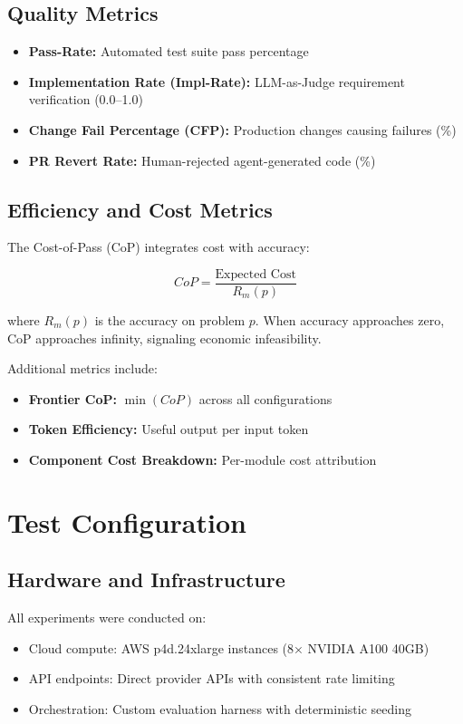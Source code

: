 \documentclass[11pt]{article}
\begin{document}
\subsection{Quality Metrics}
\begin{itemize}
    \item \textbf{Pass-Rate:} Automated test suite pass percentage
    \item \textbf{Implementation Rate (Impl-Rate):} LLM-as-Judge requirement verification (0.0--1.0)
    \item \textbf{Change Fail Percentage (CFP):} Production changes causing failures (\%)
    \item \textbf{PR Revert Rate:} Human-rejected agent-generated code (\%)
\end{itemize}

\subsection{Efficiency and Cost Metrics}
The Cost-of-Pass (CoP) integrates cost with accuracy:

\begin{equation}
    CoP = \frac{\text{Expected Cost}}{R_m(p)}
\end{equation}

where $R_m(p)$ is the accuracy on problem $p$. When accuracy approaches zero, CoP approaches infinity, signaling economic infeasibility.

Additional metrics include:
\begin{itemize}
    \item \textbf{Frontier CoP:} $\min(CoP)$ across all configurations
    \item \textbf{Token Efficiency:} Useful output per input token
    \item \textbf{Component Cost Breakdown:} Per-module cost attribution
\end{itemize}

\section{Test Configuration}

\subsection{Hardware and Infrastructure}
All experiments were conducted on:
\begin{itemize}
    \item Cloud compute: AWS p4d.24xlarge instances (8× NVIDIA A100 40GB)
    \item API endpoints: Direct provider APIs with consistent rate limiting
    \item Orchestration: Custom evaluation harness with deterministic seeding
\end{itemize}
\end{document}
